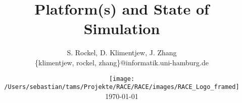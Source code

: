 




\title[Platforms and Simulation]{Platform(s) and State of Simulation}


\author[S. Rockel, D. Klimentjew, J. Zhang]{S. Rockel, D. Klimentjew, J. Zhang\textbf{}\\
{\small \{klimentjew, rockel, zhang\}@informatik.uni-hamburg.de\vspace{-1em}
}}


\date{\texttt{[image: /Users/sebastian/tams/Projekte/RACE/RACE/images/RACE\_Logo\_framed]}\\
\today}

\makebeamertitle


